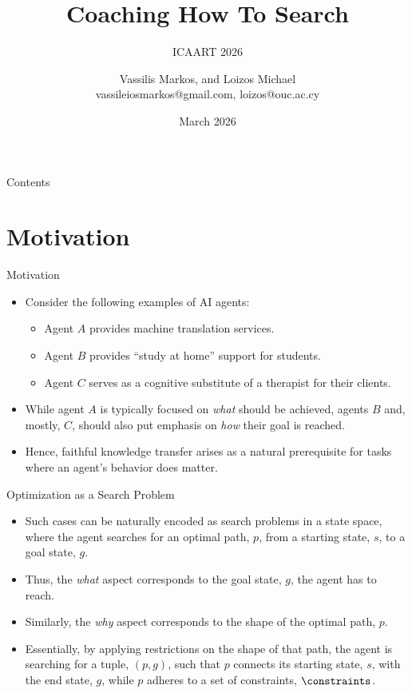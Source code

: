 \documentclass[aspectratio=169]{beamer}
\title{Coaching How To Search}
\subtitle{ICAART 2026}
\author{Vassilis Markos, and Loizos Michael\\{\ttfamily vassileiosmarkos@gmail.com, loizos@ouc.ac.cy}}
\date{March 2026}
\begin{document}
\maketitle

\begin{frame}{Contents}
    \tableofcontents
\end{frame}

\section{Motivation}

\begin{frame}{Motivation}
    \begin{itemize}[<+->]
    	\item Consider the following examples of AI agents:
    	\begin{itemize}[<+->]
    		\item Agent $A$ provides machine translation services.
    		\item Agent $B$ provides ``study at home'' support for students.
    		\item Agent $C$ serves as a cognitive substitute of a therapist for their clients.
    	\end{itemize}
    	\item While agent $A$ is typically focused on \emph{what} should be achieved, agents $B$ and, mostly, $C$, should also put emphasis on \emph{how} their goal is reached.
    	\item Hence, faithful knowledge transfer arises as a natural prerequisite for tasks where an agent's behavior does matter.
    \end{itemize}
\end{frame}

\begin{frame}{Optimization as a Search Problem}
    \begin{itemize}[<+->]
        \item Such cases can be naturally encoded as search problems in a state space, where the agent searches for an optimal path, $p$, from a starting state, $s$, to a goal state, $g$.
        \item Thus, the \emph{what} aspect corresponds to the goal state, $g$, the agent has to reach.
        \item Similarly, the \emph{why} aspect corresponds to the shape of the optimal path, $p$.
        \item Essentially, by applying restrictions on the shape of that path, the agent is searching for a tuple, $(p,g)$, such that $p$ connects its starting state, $s$, with the end state, $g$, while $p$ adheres to a set of constraints, $\constraints$.
    \end{itemize}
\end{frame}
\end{document}
